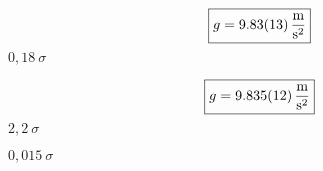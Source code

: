 \[\boxed{g =\SI{9,83 \pm 0,13 }{\frac{\meter}{\second^2}}}\]
$0,18\ \sigma$

\[\boxed{g = \SI{9,835 \pm 0,012}{\frac{\meter}{\second^2}}}\]
$2,2\ \sigma$



$0,015\ \sigma$